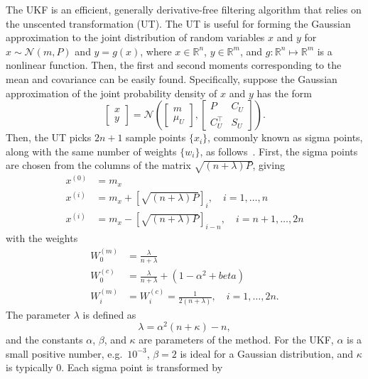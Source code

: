 \documentclass[../zhang_thesis.tex]{subfiles}
\begin{document}
The UKF is an efficient, generally derivative-free filtering algorithm that relies on the unscented transformation (UT). The UT is useful for forming the Gaussian approximation to the joint distribution of random variables $x$ and $y$ for $x\sim \mathcal{N}(m,P)$ and $y=g(x)$, where $x\in\mathbb{R}^n$, $y\in\mathbb{R}^m$, and $g:\mathbb{R}^n\mapsto\mathbb{R}^m$ is a nonlinear function. Then, the first and second moments corresponding to the mean and covariance can be
easily found. Specifically, suppose the Gaussian approximation of the joint probability density of $x$ and $y$ has the form
\begin{equation}
    \begin{bmatrix} x \\ y \end{bmatrix} = \mathcal{N} \left( \begin{bmatrix} m \\ \mu_U \end{bmatrix}, \begin{bmatrix} P & C_U \\ C_U^\top & S_U \end{bmatrix} \right).
\end{equation}
Then, the UT picks $2n+1$ sample points $\{x_i\}$, commonly known as sigma points, along with the same number of weights $\{w_i\}$, as follows~\cite{sarkka07}. First, the sigma points are chosen from the columns of the matrix $\sqrt{(n+\lambda)P}$, giving
\begin{align}
    x^{(0)} & = m_x \\
    x^{(i)} & = m_x + \left[ \sqrt{(n+\lambda)P} \right]_i, \quad i=1,\dots,n \\
    x^{(i)} & = m_x - \left[ \sqrt{(n+\lambda)P} \right]_{i-n}, \quad i=n+1,\dots,2n
\end{align}
with the weights
\begin{align}
    W_0^{(m)} & = \frac{\lambda}{n+\lambda} \\
    W_0^{(c)} & = \frac{\lambda}{n+\lambda} + (1-\alpha^2+beta) \\
    W_i^{(m)} & = W_i^{(c)} = \frac{1}{2(n+\lambda)}, \quad i=1,\dots,2n.
\end{align}
The parameter $\lambda$ is defined as
\begin{equation}
    \lambda = \alpha^2 (n+\kappa) - n,
\end{equation}
and the constants $\alpha$, $\beta$, and $\kappa$ are parameters of the method. For the UKF, $\alpha$ is a small positive number, e.g.\ $10^{-3}$, $\beta=2$ is ideal for a Gaussian distribution, and $\kappa$ is typically 0. Each sigma point is transformed by
\end{document}
